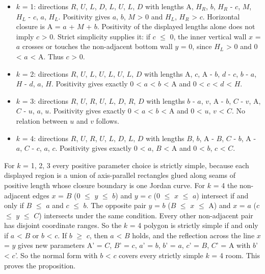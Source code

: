 \documentclass[11pt]{article}
\begin{document}
\begin{itemize}
\item \(k\) = 1: directions \(R\), \(U\), \(L\), \(D\), \(L\), \(U\), \(L\), \(D\) with lengths A, \(H_{R}\), \(b\), \(H_{R}\) - \(c\), \(M\), \(H_{L}\) - \(c\), \(a\), \(H_{L}\). Positivity gives \(a\), \(b\), \(M\) > 0 and \(H_{L}\), \(H_{R}\) > \(c\). Horizontal closure is A = \(a\) + \(M\) + \(b\). Positivity of the displayed lengths alone does not imply \(c\) > 0. Strict simplicity supplies it: if \(c\) \(\le\) 0, the inner vertical wall \(x\) = \(a\) crosses or touches the non-adjacent bottom wall \(y\) = 0, since \(H_{L}\) > 0 and 0 < \(a\) < A. Thus \(c\) > 0.
\item \(k\) = 2: directions \(R\), \(U\), \(L\), \(U\), \(L\), \(U\), \(L\), \(D\) with lengths A, \(c\), A - \(b\), \(d\) - \(c\), \(b\) - \(a\), \(H\) - \(d\), \(a\), \(H\). Positivity gives exactly 0 < \(a\) < \(b\) < A and 0 < \(c\) < \(d\) < \(H\).
\item \(k\) = 3: directions \(R\), \(U\), \(R\), \(U\), \(L\), \(D\), \(R\), \(D\) with lengths \(b\) - \(a\), \(v\), A - \(b\), \(C\) - \(v\), A, \(C\) - \(u\), \(a\), \(u\). Positivity gives exactly 0 < \(a\) < \(b\) < A and 0 < \(u\), \(v\) < \(C\). No relation between \(u\) and \(v\) follows.
\item \(k\) = 4: directions \(R\), \(U\), \(R\), \(U\), \(L\), \(D\), \(L\), \(D\) with lengths \(B\), \(b\), A - \(B\), \(C\) - \(b\), A - \(a\), \(C\) - \(c\), \(a\), \(c\). Positivity gives exactly 0 < \(a\), \(B\) < A and 0 < \(b\), \(c\) < \(C\).
\end{itemize}
For \(k\) = 1, 2, 3 every positive parameter choice is strictly simple, because each displayed region is a union of axis-parallel rectangles glued along seams of positive length whose closure boundary is one Jordan curve. For \(k\) = 4 the non-adjacent edges \(x\) = \(B\) (0 \(\le\) \(y\) \(\le\) \(b\)) and \(y\) = \(c\) (0 \(\le\) \(x\) \(\le\) \(a\)) intersect if and only if \(B\) \(\le\) \(a\) and \(c\) \(\le\) \(b\). The opposite pair \(y\) = \(b\) (\(B\) \(\le\) \(x\) \(\le\) A) and \(x\) = \(a\) (\(c\) \(\le\) \(y\) \(\le\) \(C\)) intersects under the same condition. Every other non-adjacent pair has disjoint coordinate ranges. So the \(k\) = 4 polygon is strictly simple if and only if \(a\) < \(B\) or \(b\) < \(c\). If \(b\) \(\ge\) \(c\), then \(a\) < \(B\) holds, and the reflection across the line \(x\) = \(y\) gives new parameters A' = \(C\), \(B\)' = \(c\), \(a\)' = \(b\), \(b\)' = \(a\), \(c\)' = \(B\), \(C\)' = A with \(b\)' < \(c\)'. So the normal form with \(b\) < \(c\) covers every strictly simple \(k\) = 4 room. This proves the proposition.
\end{document}
